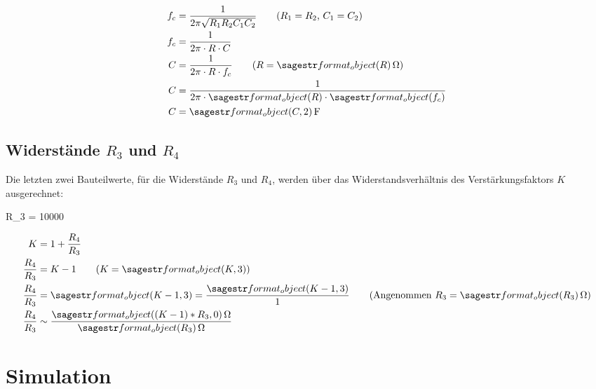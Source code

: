 \documentclass[a4paper]{hitec}
\begin{document}
\begin{align*}
    f_c &= \frac{1}{2\pi \sqrt{R_1 R_2 C_1 C_2}} \tag*{($R_1 = R_2$, $C_1 = C_2$)} \\
    f_c &= \frac{1}{2\pi \cdot R \cdot C} \\
    C &= \frac{1}{2\pi \cdot R \cdot f_c} \tag*{($R = \SIvar{R}{\ohm}$)} \\
    C &= \frac{1}{2\pi \cdot \var{R} \cdot \var{f_c}} \\
    C &= \SIvar{C, 2}{\farad}
\end{align*}

\subsection{Widerstände $R_3$ und $R_4$}

Die letzten zwei Bauteilwerte, für die Widerstände $R_3$ und $R_4$, werden über das Widerstandsverhältnis des Verstärkungsfaktors $K$ ausgerechnet:

\begin{sagesilent}
    R_3 = 10000
\end{sagesilent}

\begin{align*}
    K &= 1 + \frac{R_4}{R_3} \\
    \frac{R_4}{R_3} &= K - 1 \tag*{($K = \var{K, 3}$)} \\
    \frac{R_4}{R_3} &= \var{K-1, 3} = \frac{\var{K-1, 3}}{1} \tag*{(Angenommen $R_3 = \SIvar{R_3}{\ohm}$)} \\
    \frac{R_4}{R_3} &\sim \frac{\SIvar{(K-1)*R_3, 0}{\ohm}}{\SIvar{R_3}{\ohm}}
\end{align*}

\section{Simulation}
\end{document}
